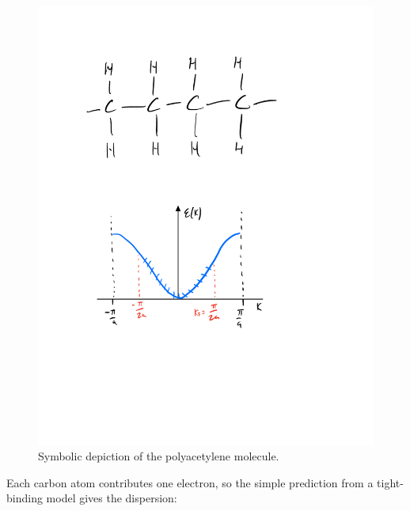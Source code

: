 \begin{figure}[htbp]
    \centering
    \includegraphics[scale=0.4]{Images/fig-polyacetylene.pdf}
    \caption{Symbolic depiction of the polyacetylene molecule.}
    \label{fig-polyacetylene}
\end{figure}
Each carbon atom contributes one electron, so the simple prediction from a tight-binding model gives the dispersion:
